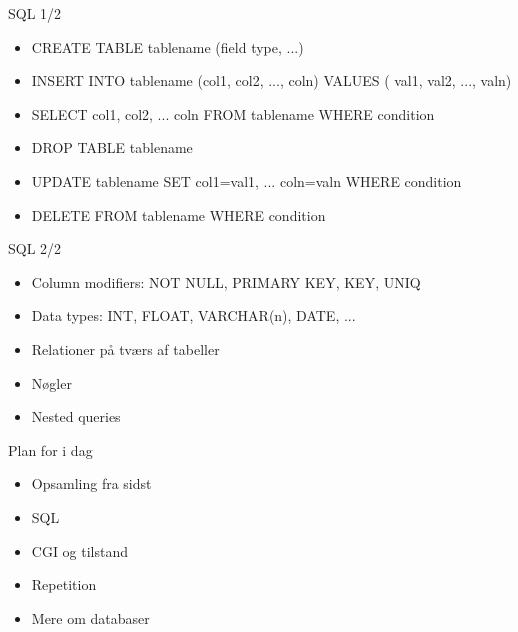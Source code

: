 \documentclass[a4paper,landscape]{slides}
\begin{document}
\begin{slide}
	\begin{center} {\large 
            SQL 1/2
	} \end{center}
	\begin{itemize} \addtolength{\itemsep}{-\baselineskip}
           \item CREATE TABLE tablename (field type, ...)
           \item INSERT INTO tablename (col1, col2, ..., coln) VALUES ( val1, val2,  ..., valn)
           \item SELECT col1, col2, ... coln FROM tablename WHERE condition
           \item DROP TABLE tablename 
           \item UPDATE tablename SET col1=val1, ... coln=valn WHERE condition
           \item DELETE FROM tablename WHERE condition
	\end{itemize}
\end{slide}
\begin{slide}
	\begin{center} {\large 
            SQL 2/2
	} \end{center}
	\begin{itemize} \addtolength{\itemsep}{-\baselineskip}
           \item Column modifiers: NOT NULL, PRIMARY KEY, KEY, UNIQ
           \item Data types: INT, FLOAT, VARCHAR(n), DATE, ...
            \item Relationer på tværs af tabeller
            \item Nøgler
           \item Nested queries
	\end{itemize}
\end{slide}

\begin{slide}
	\begin{center} {\large 
            Plan for i dag
	} \end{center}
	\begin{itemize} \addtolength{\itemsep}{-\baselineskip}
		\item Opsamling fra sidst
		\item SQL
		\item CGI og tilstand
		\item Repetition
		\item Mere om databaser
	\end{itemize}
\end{slide}
\end{document}
